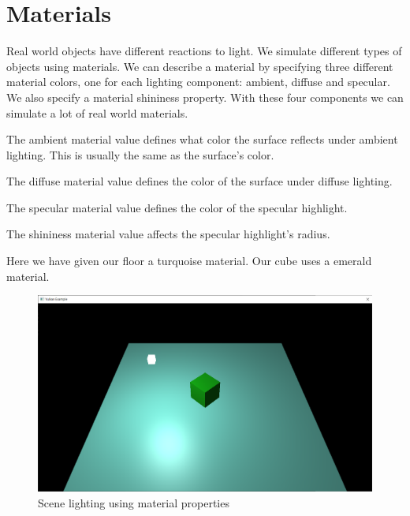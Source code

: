 \section{Materials}

Real world objects have different reactions to light.
We simulate different types of objects using materials.
We can describe a material by specifying three different material colors,
one for each lighting component: ambient, diffuse and specular.
We also specify a material shininess property.
With these four components we can simulate a lot of real world materials.

The ambient material value defines what color the surface reflects under ambient
lighting.
This is usually the same as the surface's color.

The diffuse material value defines the color of the surface under diffuse lighting.

The specular material value defines the color of the specular highlight.

The shininess material value affects the specular highlight's radius.

Here we have given our floor a turquoise material.
Our cube uses a emerald material.

\begin{minipage}{\linewidth}{\noindent}
    
\end{minipage}

\begin{minipage}{\linewidth}{\noindent}
    
\end{minipage}

\begin{figure}[ht]
    \centering
    \includegraphics[scale=0.25]{images/ChBlinnPhong/SceneMaterials.png}
    \caption{Scene lighting using material properties}
    \label{fig::SceneMaterials}
\end{figure}

